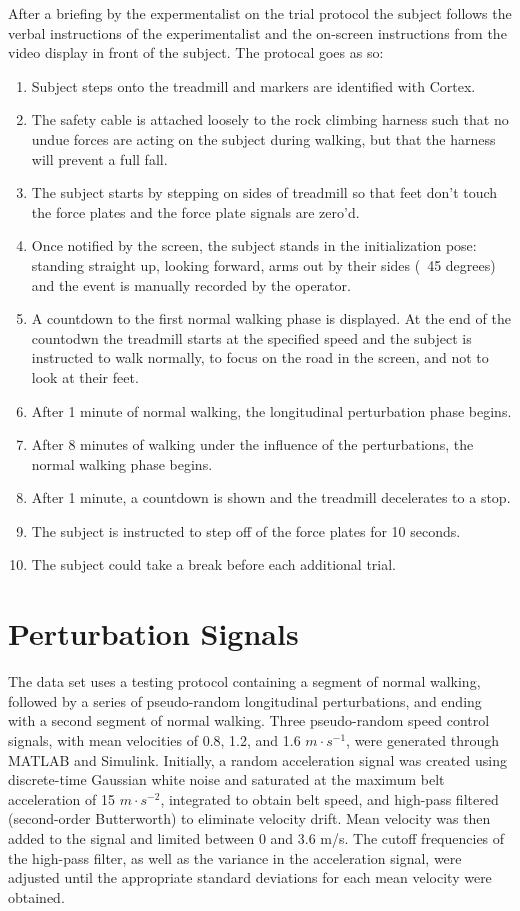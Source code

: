 \documentclass[10pt,a4paper,twocolumn]{article}
\begin{document}
After a briefing by the expermentalist on the trial protocol the subject
follows the verbal instructions of the experimentalist and the on-screen
instructions from the video display in front of the subject. The protocal goes
as so:
%
\begin{enumerate}
  \item Subject steps onto the treadmill and markers are identified with
    Cortex.
  \item The safety cable is attached loosely to the rock climbing harness such
    that no undue forces are acting on the subject during walking, but that the
    harness will prevent a full fall.
  \item The subject starts by stepping on sides of treadmill so that feet don't
    touch the force plates and the force plate signals are zero'd.
  \item Once notified by the screen, the subject stands in the initialization
    pose: standing straight up, looking forward, arms out by their sides (~45
    degrees) and the event is manually recorded by the operator.
  \item A countdown to the first normal walking phase is displayed. At the end
    of the countodwn the treadmill starts at the specified speed and the
    subject is instructed to walk normally, to focus on the road in the
    screen, and not to look at their feet.
  \item After 1 minute of normal walking, the longitudinal perturbation phase
    begins.
  \item After 8 minutes of walking under the influence of the perturbations,
    the normal walking phase begins.
  \item After 1 minute, a countdown is shown and the treadmill decelerates to a
    stop.
  \item The subject is instructed to step off of the force plates for 10
    seconds.
  \item The subject could take a break before each additional trial.
\end{enumerate}

\section*{Perturbation Signals}
%
The data set uses a testing protocol containing a segment of normal walking,
followed by a series of pseudo-random longitudinal perturbations, and ending
with a second segment of normal walking. Three pseudo-random speed control
signals, with mean velocities of 0.8, 1.2, and 1.6 $m \cdot s^{-1}$, were
generated through MATLAB and Simulink. Initially, a  random acceleration signal
was created using discrete-time Gaussian white noise and saturated at the
maximum belt acceleration of 15 $m \cdot s^{-2}$, integrated to obtain belt
speed, and high-pass filtered (second-order Butterworth) to eliminate velocity
drift. Mean velocity was then added to the signal and limited between 0 and 3.6
m/s. The cutoff frequencies of the high-pass filter, as well as the variance in
the acceleration signal, were adjusted until the appropriate standard
deviations for each mean velocity were obtained.
\end{document}
